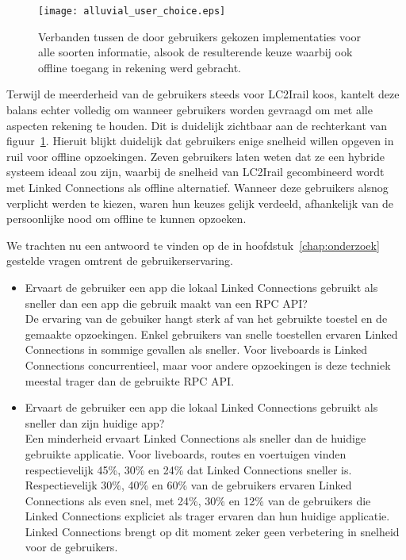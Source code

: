 \begin{figure}[ht]
	\centering
	\texttt{[image: alluvial\_user\_choice.eps]}
	\caption[Door gebruikers gekozen implementatie]{Verbanden tussen de door gebruikers gekozen implementaties voor alle soorten informatie, alsook de resulterende keuze waarbij ook offline toegang in rekening werd gebracht. }
	\label{fig:alluvialUserChoices}
\end{figure}

Terwijl de meerderheid van de gebruikers steeds voor LC2Irail koos, kantelt deze balans echter volledig om wanneer gebruikers worden gevraagd om met alle aspecten rekening te houden. Dit is duidelijk zichtbaar aan de rechterkant van figuur~\ref{fig:alluvialUserChoices}. Hieruit blijkt duidelijk dat gebruikers enige snelheid willen opgeven in ruil voor offline opzoekingen. Zeven gebruikers laten weten dat ze een hybride systeem ideaal zou zijn, waarbij de snelheid van LC2Irail gecombineerd wordt met Linked Connections als offline alternatief. Wanneer deze gebruikers alsnog verplicht werden te kiezen, waren hun keuzes gelijk verdeeld, afhankelijk van de persoonlijke nood om offline te kunnen opzoeken. 


We trachten nu een antwoord te vinden op de in hoofdstuk~\ref{chap:onderzoek} gestelde vragen omtrent de gebruikerservaring.
\begin{itemize}
	\item Ervaart de gebruiker een app die lokaal Linked Connections gebruikt als sneller dan een app die gebruik maakt van een RPC API?\\
	De ervaring van de gebuiker hangt sterk af van het gebruikte toestel en de gemaakte opzoekingen. Enkel gebruikers van snelle toestellen ervaren Linked Connections in sommige gevallen als sneller. Voor liveboards is Linked Connections concurrentieel, maar voor andere opzoekingen is deze techniek meestal trager dan de gebruikte RPC API.
	\item Ervaart de gebruiker een app die lokaal Linked Connections gebruikt als sneller dan zijn huidige app?\\
	Een minderheid ervaart Linked Connections als sneller dan de huidige gebruikte applicatie. Voor liveboards, routes en voertuigen vinden respectievelijk 45\%, 30\% en 24\% dat Linked Connections sneller is. Respectievelijk 30\%, 40\% en 60\% van de gebruikers ervaren Linked Connections als even snel, met 24\%, 30\% en 12\% van de gebruikers die Linked Connections expliciet als trager ervaren dan hun huidige applicatie. Linked Connections brengt op dit moment zeker geen verbetering in snelheid voor de gebruikers.
\end{itemize}


